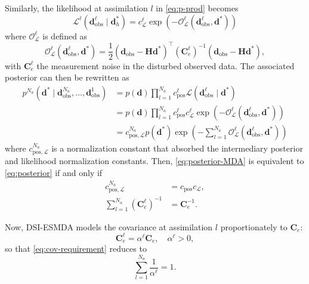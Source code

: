 Similarly, the likelihood at assimilation $l$ in \cref{eq:p-prod} becomes
%
\begin{equation}
    \mathcal{L}^\ell(\mathbf{d}_\text{obs}^\ell \mid \mathbf{d}^*_h) =
    c^\ell_\mathcal{L} \exp(-\mathcal{O}^\ell_\mathcal{L}(\mathbf{d}^\ell_\text{obs}, \mathbf{d}^*))
\end{equation}
%
where $\mathcal{O}^\ell_\mathcal{L}$ is defined as
%
\begin{equation}
    \mathcal{O}^\ell_\mathcal{L}(\mathbf{d}^\ell_\text{obs}, \mathbf{d}^*) =
    \frac{1}{2} 
    (\mathbf{d}_\text{obs} - \mathbf{H}\mathbf{d}^*)^\top 
    (\mathbf{C}^\ell_e)^{-1}
    (\mathbf{d}_\text{obs} - \mathbf{H}\mathbf{d}^*),
\end{equation}
%
with $\mathbf{C}^\ell_e$ the measurement noise in the disturbed observed data.
%
The associated posterior can then be rewritten as 
%
\begin{align}
    p^{N_a}(\mathbf{d}^* \mid \mathbf{d}^{N_a}_\text{obs}, \dots, \mathbf{d}^1_\text{obs}) 
    &=
    p(\mathbf{d}) 
    \prod_{l=1}^{N_a} 
        c^\ell_\text{pos} 
        \mathcal{L}(\mathbf{d}^\ell_\text{obs}\mid \mathbf{d}^*) \\
    &=
    p(\mathbf{d}) 
    \prod_{l=1}^{N_a} 
        c^\ell_\text{pos} 
        c^\ell_\mathcal{L}
        \exp(-\mathcal{O}^\ell_\mathcal{L}(\mathbf{d}^\ell_\text{obs}, \mathbf{d}^*)) \\
    &=
    c^{N_a}_{\text{pos},\mathcal{L}} 
    p(\mathbf{d}^*)
    \exp\left(
        -\sum_{l=1}^{N_a} \mathcal{O}^\ell_\mathcal{L}(\mathbf{d}^\ell_\text{obs}, \mathbf{d}^*)
    \right) 
\label{eq:posterior-MDA}
\end{align}
%
where $c^{N_a}_{\text{pos},\mathcal{L}}$ is a normalization constant that 
absorbed the intermediary posterior and likelihood normalization constants.
%
Then, \cref{eq:posterior-MDA} is equivalent to \cref{eq:posterior} if and only if 
%
\begin{subequations}
    \begin{alignat}{4}
        c^{N_a}_{\text{pos},\mathcal{L}} &= c_\text{pos} c_\mathcal{L}, \\
        \sum_{l=1}^{N_a} (\mathbf{C}^\ell_e)^{-1} &= \mathbf{C}^{-1}_e.
        \label{eq:cov-requirement}
    \end{alignat}
\end{subequations}

Now, DSI-ESMDA models the covariance at assimilation $l$ proportionately to $\mathbf{C}_e$:
%
\begin{equation}
    \mathbf{C}^\ell_e = \alpha^\ell \mathbf{C}_e, 
    \quad 
    \alpha^\ell > 0,
\label{eq:cov-as-inflation}
\end{equation}
%
so that \cref{eq:cov-requirement} reduces to
%
\begin{equation}
    \sum_{l=1}^{N_a} \frac{1}{\alpha^\ell} = 1.
\label{eq:alpha-requirement}
\end{equation}

